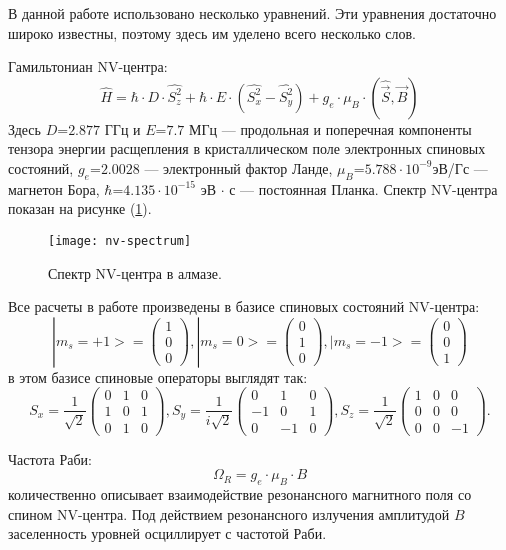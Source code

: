 \newpage
{}
В данной работе использовано несколько уравнений. Эти уравнения
достаточно широко известны, поэтому здесь им уделено всего несколько
слов.

Гамильтониан NV-центра:
\begin{equation}\label{eq:shamiltonian}
\hat{H} = \hbar\cdot D\cdot \hat{S_z^2} + \hbar\cdot E\cdot (\hat{S_x^2} - \hat{S_y^2}) +
g_e\cdot \mu_B\cdot (\hat{\vec{S}}, \vec{B})
\end{equation}
Здесь $D$=$2.877$ ГГц и $E$=$7.7$ МГц --- продольная и поперечная
компоненты тензора энергии расщепления в кристаллическом поле
электронных спиновых состояний, $g_e$=$2.0028$ --- электронный фактор
Ланде, $\mu_B$=$5.788 \cdot 10^{-9}$эВ/Гс --- магнетон Бора,
$\hbar$=$4.135 \cdot 10^{-15}$ эВ $\cdot$ с --- постоянная Планка. 
Спектр NV-центра показан на рисунке (\ref{fig:nv-spectrum}). 
\begin{figure}[H]\centering
  \texttt{[image: nv-spectrum]}
  \caption{Спектр NV-центра в алмазе.}\label{fig:nv-spectrum}
\end{figure}

Все
расчеты в работе произведены в базисе спиновых состояний NV-центра:
\[ 
   |m_s=+1> = \left(
   \begin{array}{c}
   1 \\ 0 \\ 0
   \end{array} \right),
   |m_s=0> = \left(
   \begin{array}{c}
   0 \\ 1 \\ 0
   \end{array} \right),
   |m_s=-1> = \left(
   \begin{array}{c}
   0 \\ 0 \\ 1
   \end{array} \right)
\]
в этом базисе спиновые операторы выглядят так:
\[
   S_x = \frac{1}{\sqrt{2}} \left(
   \begin{array}{ccc}
    0 & 1 & 0 \\
    1 & 0 & 1 \\
    0 & 1 & 0
   \end{array} \right),
   S_y = \frac{1}{i \sqrt{2}} \left(
   \begin{array}{ccc}
    0 & 1 & 0 \\
    -1 & 0 & 1 \\
    0 & -1 & 0
   \end{array} \right),
   S_z = \frac{1}{\sqrt{2}} \left(
   \begin{array}{ccc}
    1 & 0 & 0 \\
    0 & 0 & 0 \\
    0 & 0 & -1
   \end{array} \right).
\]

Частота Раби:
\[ 
\Omega_R = g_e \cdot \mu_B \cdot B
\]
количественно описывает взаимодействие резонансного магнитного поля со
спином NV-центра. Под действием резонансного излучения амплитудой $B$
заселенность уровней осциллирует с частотой Раби.
